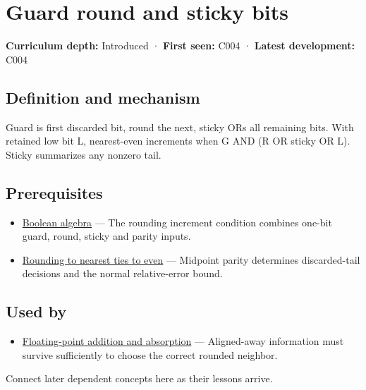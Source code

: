 \hypertarget{appendix-b572b631069b}{}\label{referencestart:appendix-b572b631069b}
\section{Guard round and sticky bits}\label{appendix-b572b631069b-guard-round-and-sticky-bits}

\textbf{Curriculum depth:} Introduced · \textbf{First seen:} C004 · \textbf{Latest development:} C004

\subsection{Definition and mechanism}\label{appendix-b572b631069b-definition-and-mechanism}

Guard is first discarded bit, round the next, sticky ORs all remaining bits. With retained low bit L, nearest-even increments when G AND (R OR sticky OR L). Sticky summarizes any nonzero tail.

\subsection{Prerequisites}\label{appendix-b572b631069b-prerequisites}

\begin{itemize}
\tightlist
\item
  \hyperref[appendix-24475e1596a8]{Boolean algebra} --- The rounding increment condition combines one-bit guard, round, sticky and parity inputs.
\item
  \hyperref[appendix-614afe1de592]{Rounding to nearest ties to even} --- Midpoint parity determines discarded-tail decisions and the normal relative-error bound.
\end{itemize}

\subsection{Used by}\label{appendix-b572b631069b-used-by}

\begin{itemize}
\tightlist
\item
  \hyperref[appendix-a1b1b4580dfd]{Floating-point addition and absorption} --- Aligned-away information must survive sufficiently to choose the correct rounded neighbor.
\end{itemize}

Connect later dependent concepts here as their lessons arrive.

